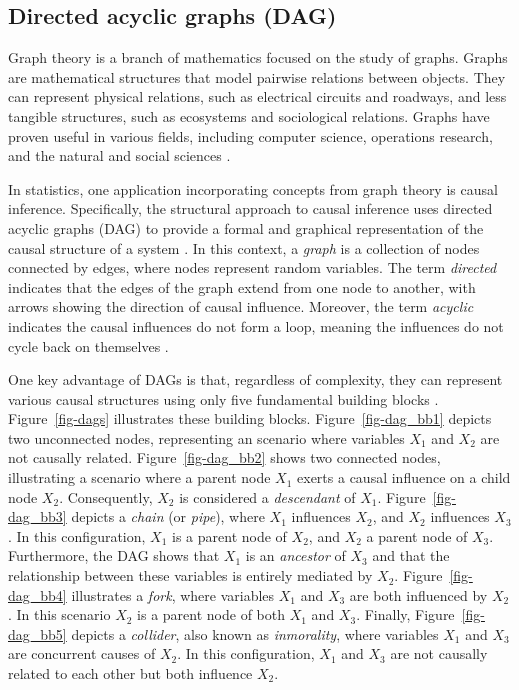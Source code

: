 \documentclass[
  authoryear,
  preprint,
  1p]{elsarticle}
\begin{document}
\subsection{Directed acyclic graphs (DAG)}\label{sec-framework-dag}

Graph theory is a branch of mathematics focused on the study of graphs.
Graphs are mathematical structures that model pairwise relations between
objects. They can represent physical relations, such as electrical
circuits and roadways, and less tangible structures, such as ecosystems
and sociological relations. Graphs have proven useful in various fields,
including computer science, operations research, and the natural and
social sciences \citep{Gross_et_al_2018}.

In statistics, one application incorporating concepts from graph theory
is causal inference. Specifically, the structural approach to causal
inference uses directed acyclic graphs (DAG) to provide a formal and
graphical representation of the causal structure of a system
\citep{Neal_2020}. In this context, a \emph{graph} is a collection of
nodes connected by edges, where nodes represent random variables. The
term \emph{directed} indicates that the edges of the graph extend from
one node to another, with arrows showing the direction of causal
influence. Moreover, the term \emph{acyclic} indicates the causal
influences do not form a loop, meaning the influences do not cycle back
on themselves \citep{McElreath_2020}.

One key advantage of DAGs is that, regardless of complexity, they can
represent various causal structures using only five fundamental building
blocks \citep{Neal_2020, McElreath_2020}. Figure~\ref{fig-dags}
illustrates these building blocks. Figure~\ref{fig-dag_bb1} depicts two
unconnected nodes, representing an scenario where variables \(X_{1}\)
and \(X_{2}\) are not causally related. Figure~\ref{fig-dag_bb2} shows
two connected nodes, illustrating a scenario where a parent node
\(X_{1}\) exerts a causal influence on a child node \(X_{2}\).
Consequently, \(X_{2}\) is considered a \emph{descendant} of \(X_{1}\).
Figure~\ref{fig-dag_bb3} depicts a \emph{chain} (or \emph{pipe}), where
\(X_{1}\) influences \(X_{2}\), and \(X_{2}\) influences \(X_{3}\). In
this configuration, \(X_{1}\) is a parent node of \(X_{2}\), and
\(X_{2}\) a parent node of \(X_{3}\). Furthermore, the DAG shows that
\(X_{1}\) is an \emph{ancestor} of \(X_{3}\) and that the relationship
between these variables is entirely mediated by \(X_{2}\).
Figure~\ref{fig-dag_bb4} illustrates a \emph{fork}, where variables
\(X_{1}\) and \(X_{3}\) are both influenced by \(X_{2}\). In this
scenario \(X_{2}\) is a parent node of both \(X_{1}\) and \(X_{3}\).
Finally, Figure~\ref{fig-dag_bb5} depicts a \emph{collider}, also known
as \emph{inmorality}, where variables \(X_{1}\) and \(X_{3}\) are
concurrent causes of \(X_{2}\). In this configuration, \(X_{1}\) and
\(X_{3}\) are not causally related to each other but both influence
\(X_{2}\).
\end{document}
